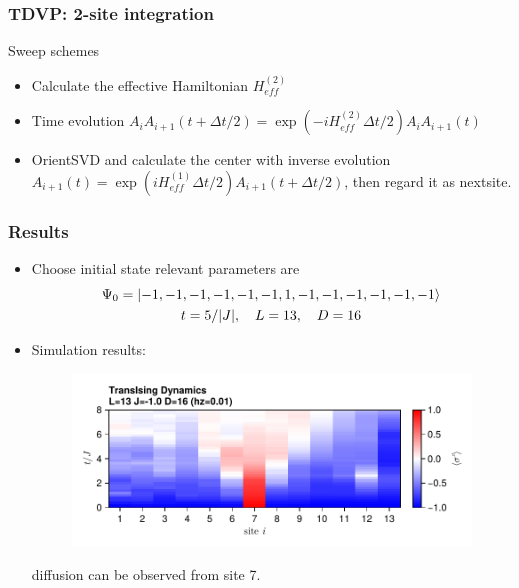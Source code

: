 \documentclass{beamer}
\begin{document}
\begin{frame}
	\frametitle{TDVP: 2-site integration}
	Sweep schemes
	\begin{itemize}
		\item Calculate the effective Hamiltonian $H_{eff}^{(2)}$
		\item Time evolution $A_iA_{i+1}(t+\Delta t/2) = \exp(-iH_{eff}^{(2)}\Delta t / 2)A_iA_{i+1}(t)$ 
		\item OrientSVD and calculate the center with inverse evolution $A_{i+1}(t) = \exp(iH_{eff}^{(1)}\Delta t /2) A_{i+1}(t+\Delta t/2)$, then regard it as nextsite.
		\begin{figure}[H]
			\centering
			\subfigbottomskip=2pt
			\subfigcapskip=-5pt
		\end{figure}
	\end{itemize}
\end{frame}

\begin{frame}
	\frametitle{Results}
	\begin{itemize}
		\item Choose initial state relevant parameters are
		\begin{gather}
			\Psi_0 = \ket{-1,-1,-1,-1,-1,-1,1,-1,-1,-1,-1,-1,-1}\\
			t=5/\abs{J},\quad L=13,\quad D=16
		\end{gather}
		\item Simulation results:
		\begin{figure}[H]
			\includegraphics[width=0.75 \linewidth]{images/DiffMi_D=16_L=13_J=-1.0.pdf}
		\end{figure}
		diffusion can be observed from site 7.
	\end{itemize}
\end{frame}
\end{document}
